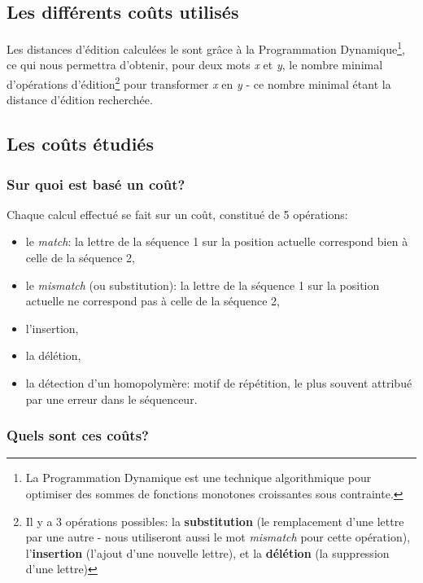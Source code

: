 \documentclass[12pt]{report}
\begin{document}
\begin{spacing}{1.2}
\section{Les différents coûts utilisés}

Les distances d'édition calculées le sont grâce à la Programmation Dynamique\footnote{La Programmation Dynamique est une technique algorithmique pour optimiser des sommes de fonctions monotones croissantes sous contrainte.}, ce qui nous permettra d'obtenir, pour deux mots \textit{x} et \textit{y}, le nombre minimal d’opérations d’édition\footnote{Il y a 3 opérations possibles: la \textbf{substitution} (le remplacement d'une lettre par une autre - nous utiliseront aussi le mot \textit{mismatch} pour cette opération), l'\textbf{insertion} (l'ajout d'une nouvelle lettre), et la \textbf{délétion} (la suppression d'une lettre)} pour transformer \textit{x} en \textit{y} - ce nombre minimal étant la distance d'édition recherchée.

\subsection{Les coûts étudiés}

\subsubsection{Sur quoi est basé un coût?}

Chaque calcul effectué se fait sur un coût, constitué de 5 opérations:
\begin{itemize}
\item{le \textit{match}: la lettre de la séquence 1 sur la position actuelle correspond bien à celle de la séquence 2,}
\item{le \textit{mismatch} (ou substitution): la lettre de la séquence 1 sur la position actuelle ne correspond pas à celle de la séquence 2,}
\item{l'insertion,}
\item{la délétion,}
\item{la détection d'un homopolymère: motif de répétition, le plus souvent attribué par une erreur dans le séquenceur.}
\end{itemize}

\subsubsection{Quels sont ces coûts?}


\end{spacing}
\end{document}
